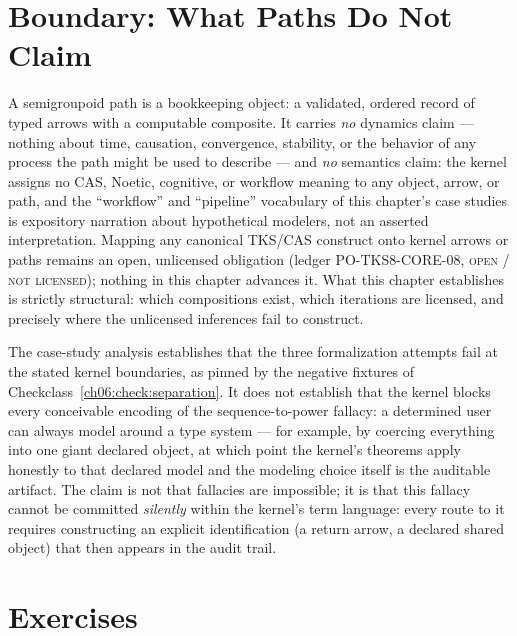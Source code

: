 \section{Boundary: What Paths Do Not Claim}
\label{ch06:sec:boundary}

\begin{boundary}
\label{ch06:bound:nodynamics}
A semigroupoid path is a bookkeeping object: a validated, ordered record of
typed arrows with a computable composite. It carries \emph{no} dynamics
claim --- nothing about time, causation, convergence, stability, or the
behavior of any process the path might be used to describe --- and
\emph{no} semantics claim: the kernel assigns no CAS, Noetic, cognitive,
or workflow meaning to any object, arrow, or path, and the ``workflow''
and ``pipeline'' vocabulary of this chapter's case studies is expository
narration about hypothetical modelers, not an asserted interpretation.
Mapping any canonical TKS/CAS construct onto kernel arrows or paths
remains an open, unlicensed obligation (ledger PO-TKS8-CORE-08,
\textsc{open / not licensed}); nothing in this chapter advances it. What
this chapter establishes is strictly structural: which compositions exist,
which iterations are licensed, and precisely where the unlicensed
inferences fail to construct.
\end{boundary}

\begin{boundary}
\label{ch06:bound:negative-scope}
The case-study analysis establishes that the three formalization attempts
fail at the stated kernel boundaries, as pinned by the negative fixtures of
Checkclass~\ref{ch06:check:separation}. It does not establish that the
kernel blocks every conceivable encoding of the sequence-to-power fallacy:
a determined user can always model around a type system --- for example,
by coercing everything into one giant declared object, at which point the
kernel's theorems apply honestly to that declared model and the modeling
choice itself is the auditable artifact. The claim is not that fallacies
are impossible; it is that this fallacy cannot be committed \emph{silently}
within the kernel's term language: every route to it requires constructing
an explicit identification (a return arrow, a declared shared object) that
then appears in the audit trail.
\end{boundary}

\section{Exercises}
\label{ch06:sec:exercises}

